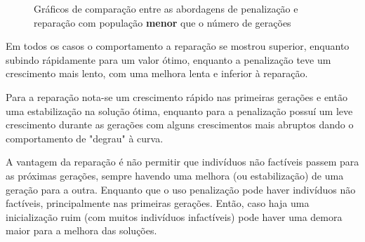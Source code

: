\documentclass[11pt]{article}
\begin{document}
\begin{figure}[!htb]
	\centering
	\quad %
	\caption{Gráficos de comparação entre as abordagens de penalização e reparação com população \textbf{menor} que o número de gerações}
	\label{fig:comparacao_populacao_menor_geracao}
\end{figure}



Em todos os casos o comportamento a reparação se mostrou superior, enquanto subindo rápidamente para um valor ótimo, enquanto a penalização teve um crescimento mais lento, com uma melhora lenta e inferior à reparação.

Para a reparação nota-se um crescimento rápido nas primeiras gerações e então uma estabilização na solução ótima, enquanto para a penalização possuí um leve crescimento durante as gerações com alguns crescimentos mais abruptos dando o comportamento de "degrau" à curva.

A vantagem da reparação é não permitir que indivíduos não factíveis passem para as próximas gerações, sempre havendo uma melhora (ou estabilização) de uma geração para a outra. Enquanto que o uso penalização pode haver indivíduos não factíveis, principalmente nas primeiras gerações. Então, caso haja uma inicialização ruim (com muitos indivíduos infactíveis) pode haver uma demora maior para a melhora das soluções.
\end{document}
